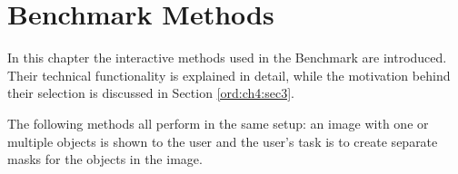 
\chapter{Benchmark Methods}\label{ord:ch3}

In this chapter the interactive methods used in the Benchmark are introduced.
Their technical functionality is explained in detail, while the motivation behind their selection is discussed in Section \ref{ord:ch4:sec3}.

The following methods all perform in the same setup: an image with one or multiple objects is shown to the user and the user's task is to create separate masks for the objects in the image.




